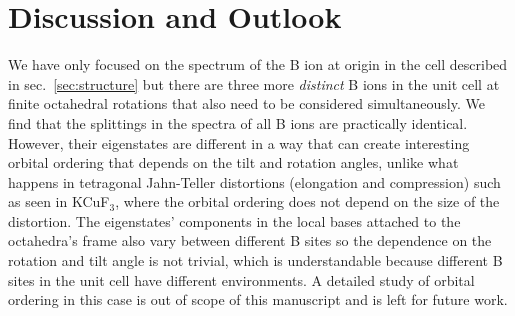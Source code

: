 \documentclass[a4paper,prb,twocolumn]{revtex4-1}  %
\newcommand{\com}[1]{}
\begin{document}
\section{Discussion and Outlook}



\com{
Based on our analysis of A and B cages,
we expect that,
in case of atomic scale perovskite superlattices
with cations having different charges in alternating layers,
the crystal field at B sites will bear the exact same deformation as in case of 
a tetragonal distortion of the octahedra,
and should lead to 
a JT like splitting even 
in the symmetric structure, i.e., with no structural distortion.
Considering the charge as a dynamic variable,
it should then also be possible that in 
simple perovskites structure,
the system might encounter charge instabilities similar to the structural ones,
where the system is stabilised by a charge transfer from one site to another
that lowers the electronic energy and costs 
the ``elastic'' energy proportional to the chemical hardness of the ions involved.
Such considerations might be useful in studying polaron formation and dynamics.
}



We have only focused on the spectrum of the B ion at 
origin
 in the cell 
described in sec.~\ref{sec:structure}
but 
there are three more \emph{distinct} B ions in the unit cell 
at finite octahedral rotations that also 
need to be considered simultaneously.
We find that the splittings in the spectra
of all B ions are
practically identical.
However, their eigenstates 
are different in a way that can
create interesting orbital ordering
that depends on the tilt and rotation angles,
unlike what happens in 
tetragonal Jahn-Teller distortions (elongation and compression) 
such as seen in KCuF$_3$, 
where the orbital ordering does not depend on the size of the distortion.
The eigenstates' components in the local bases attached to the octahedra's frame
also vary between different B sites 
so the dependence on the rotation and tilt angle is not trivial,
which is understandable because different B sites in the unit cell have different environments. 
A detailed study of orbital ordering in this case is out of scope of this manuscript and is left for future work.
\end{document}
